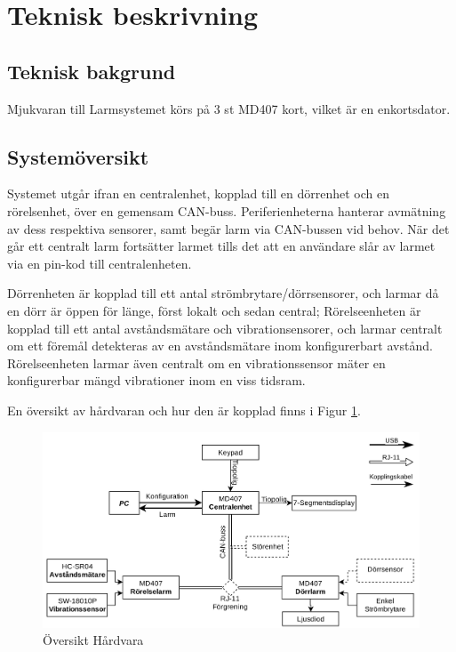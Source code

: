 \documentclass{article}
\begin{document}
\section{Teknisk beskrivning} %
\subsection{Teknisk bakgrund}
Mjukvaran till Larmsystemet körs på 3 st MD407 kort, vilket är en 
enkortsdator.
\subsection{Systemöversikt}

Systemet utgår ifran en centralenhet, kopplad till en dörrenhet och en rörelsenhet, över en gemensam CAN-buss. Periferienheterna hanterar avmätning av dess respektiva sensorer, samt begär larm via CAN-bussen vid behov. När det går ett centralt larm fortsätter larmet tills det att en användare slår av larmet via en pin-kod till centralenheten.

Dörrenheten är kopplad till ett antal strömbrytare/dörrsensorer, och larmar då en dörr är öppen för länge, först lokalt och sedan central; Rörelseenheten är kopplad till ett antal avståndsmätare och vibrationsensorer, och larmar centralt om ett föremål detekteras av en avståndsmätare inom konfigurerbart avstånd. Rörelseenheten larmar även centralt om en vibrationssensor mäter en konfigurerbar mängd vibrationer inom en viss tidsram. %

En översikt av hårdvaran och hur den är kopplad finns i Figur \ref{fig:hårdvara}.
\begin{figure}[H]
    \centering
    \includegraphics[width=1\textwidth]{projektrapport/figurer/HardvaraOversikt.jpg}
    \caption{Översikt Hårdvara}
    \label{fig:hårdvara}
\end{figure}
\end{document}
